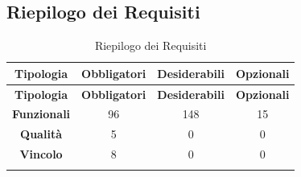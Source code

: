 \subsection{Riepilogo dei Requisiti}
\renewcommand{\arraystretch}{1.2}
\begin{longtable}{| c | c | c | c |}
	\hline
	\rowcolor[gray]{0.9}
	\textbf{Tipologia} & \textbf{Obbligatori} & \textbf{Desiderabili} & \textbf{Opzionali} \\
	\hline
	\endfirsthead

	\hline
	\rowcolor[gray]{0.9}
	\textbf{Tipologia} & \textbf{Obbligatori} & \textbf{Desiderabili} & \textbf{Opzionali} \\
	\hline
	\endhead

	\hline
	\textbf{Funzionali} & 96 & 148 & 15 \\
	\hline
	\textbf{Qualità} & 5 & 0 & 0 \\
	\hline
	\textbf{Vincolo} & 8 & 0 & 0 \\
	\hline

	\caption{Riepilogo dei Requisiti}
	\label{tab:riepilogo}

\end{longtable}
